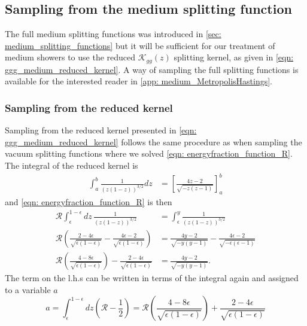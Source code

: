 \documentclass[main.tex]{subfiles}
\begin{document}
\subsection{Sampling from the medium splitting function}
The full medium splitting functions was introduced in \autoref{sec: medium_splitting_functions} but it will be sufficient for our treatment of medium showers to use the reduced \(\mathcal{K}_{gg}(z)\) splitting kernel, as given in \autoref{eqn: ggg_medium_reduced_kernel}. A way of sampling the full splitting functions is available for the interested reader in \autoref{app: medium_MetropolisHastings}. 

\subsubsection*{Sampling from the reduced kernel}
Sampling from the reduced kernel presented in \autoref{eqn: ggg_medium_reduced_kernel} follows the same procedure as when sampling the vacuum splitting functions where we solved \autoref{eqn: energyfraction_function_R}. The integral of the reduced kernel is
\begin{align}
    \int_a^b \frac{1}{(z(1-z))^{3/2}}dz &= \left[ \frac{4z-2}{\sqrt{-z(z-1)}} \right]_a^b
\end{align}
and \autoref{eqn: energyfraction_function_R} is then
\begin{align}
    \mathcal{R} \int_\epsilon^{1-\epsilon} dz \, \frac{1}{(z(1-z))^{3/2}} &= \int_\epsilon^{y} \frac{1}{(z(1-z))^{3/2}} \nonumber \\
    \mathcal{R} \left(  \frac{2-4\epsilon}{\sqrt{\epsilon(1-\epsilon)}} - \frac{4\epsilon-2}{\sqrt{\epsilon(1-\epsilon)}} \right) &= \frac{4y-2}{\sqrt{-y(y-1)}} - \frac{4\epsilon-2}{\sqrt{-\epsilon(\epsilon-1)}} \nonumber\\
    \mathcal{R} \left(  \frac{4-8\epsilon}{\sqrt{\epsilon(1-\epsilon)}} \right) - \frac{2-4\epsilon}{\sqrt{\epsilon(1-\epsilon)}} &= \frac{4y-2}{\sqrt{-y(y-1)}}.
\end{align}
The term on the l.h.s can be written in terms of the integral again and assigned to a variable \(a\)
\begin{equation}
    a = \int_\epsilon^{1-\epsilon} dz  \left(\mathcal{R} - \frac{1}{2} \right) = \mathcal{R} \left(  \frac{4-8\epsilon}{\sqrt{\epsilon(1-\epsilon)}} \right) + \frac{2-4\epsilon}{\sqrt{\epsilon(1-\epsilon)}}
\end{equation}
\end{document}
